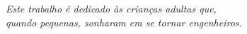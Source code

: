 \begin{dedicatoria}
   \vspace*{\fill}
   \centering
   \noindent
    \textit{ Este trabalho é dedicado às crianças adultas que,\\
    quando pequenas, sonharam em se tornar engenheiros.} 
   \vspace*{\fill}
\end{dedicatoria}